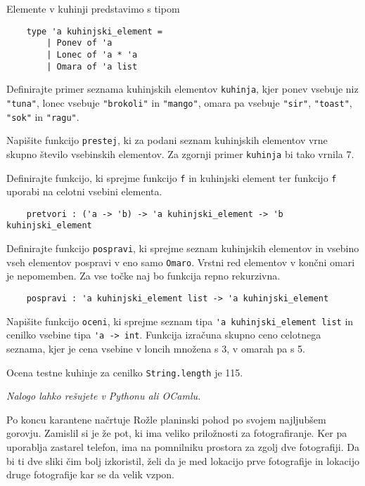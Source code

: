 \documentclass[arhiv]{../izpit}
\begin{document}
Elemente v kuhinji predstavimo s tipom
\begin{verbatim}
    type 'a kuhinjski_element =
        | Ponev of 'a
        | Lonec of 'a * 'a
        | Omara of 'a list
\end{verbatim}

\podnaloga 
Definirajte primer seznama kuhinjskih elementov \verb|kuhinja|, kjer ponev vsebuje niz \verb|"tuna"|, lonec vsebuje \verb|"brokoli"| in \verb|"mango"|, omara pa vsebuje \verb|"sir"|, \verb|"toast"|, \verb|"sok"| in \verb|"ragu"|.

\podnaloga 
Napišite funkcijo \verb|prestej|, ki za podani seznam kuhinjskih elementov vrne skupno število vsebinskih elementov. Za zgornji primer \verb|kuhinja| bi tako vrnila 7.

\podnaloga 
Definirajte funkcijo, ki sprejme funkcijo \verb|f| in kuhinjski element ter funkcijo \verb|f| uporabi na celotni vsebini elementa.
\begin{verbatim}
    pretvori : ('a -> 'b) -> 'a kuhinjski_element -> 'b kuhinjski_element
\end{verbatim}

\podnaloga 
Definirajte funkcijo \verb|pospravi|, ki sprejme seznam kuhinjskih elementov in vsebino vseh elementov pospravi v eno samo \verb|Omaro|. Vrstni red elementov v končni omari je nepomemben. Za vse točke naj bo funkcija repno rekurzivna. 
\begin{verbatim}
    pospravi : 'a kuhinjski_element list -> 'a kuhinjski_element
\end{verbatim}

\podnaloga 
Napišite funkcijo \verb|oceni|, ki sprejme seznam tipa \verb|'a kuhinjski_element list| in cenilko vsebine tipa \verb|'a -> int|. Funkcija izračuna skupno ceno celotnega seznama, kjer je cena vsebine v loncih množena s 3, v omarah pa s 5.

Ocena testne kuhinje za cenilko \verb|String.length| je 115.



\naloga
\emph{Nalogo lahko rešujete v Pythonu ali OCamlu.}

Po koncu karantene načrtuje Rožle planinski pohod po svojem najljubšem gorovju. Zamislil si je že pot, ki ima veliko priložnosti za fotografiranje. Ker pa uporablja zastarel telefon, ima na pomnilniku prostora za zgolj dve fotografiji. Da bi ti dve sliki čim bolj izkoristil, želi da je med lokacijo prve fotografije in lokacijo druge fotografije kar se da velik vzpon.
\end{document}
